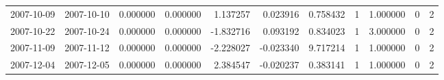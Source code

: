 \begin{table}
\begin{tabular}{llrrrrrrrrr}
2007-10-09 & 2007-10-10 & 0.000000 & 0.000000 & 1.137257 & 0.023916 & 0.758432 & 1 & 1.000000 & 0 & 2 \\
2007-10-22 & 2007-10-24 & 0.000000 & 0.000000 & -1.832716 & 0.093192 & 0.834023 & 1 & 3.000000 & 0 & 2 \\
2007-11-09 & 2007-11-12 & 0.000000 & 0.000000 & -2.228027 & -0.023340 & 9.717214 & 1 & 1.000000 & 0 & 2 \\
2007-12-04 & 2007-12-05 & 0.000000 & 0.000000 & 2.384547 & -0.020237 & 0.383141 & 1 & 1.000000 & 0 & 2 \\
\bottomrule
\end{tabular}
\end{table}
